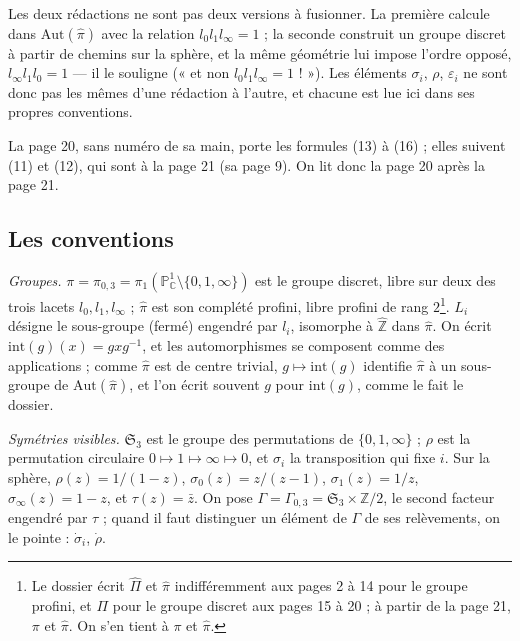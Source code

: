 \documentclass[11pt,a4paper]{article}
\begin{document}
Les deux rédactions ne sont pas deux versions à fusionner. La première
calcule dans $\mathrm{Aut}(\widehat{\pi})$ avec la relation
$l_0 l_1 l_\infty = 1$ ; la seconde construit un groupe discret à partir de
chemins sur la sphère, et la même géométrie lui impose l'ordre opposé,
$l_\infty l_1 l_0 = 1$ — il le souligne (« et non $l_0 l_1 l_\infty = 1$ ! »).
Les éléments $\sigma_i$, $\rho$, $\varepsilon_i$ ne sont donc pas les mêmes
d'une rédaction à l'autre, et chacune est lue ici dans ses propres
conventions.

La page 20, sans numéro de sa main, porte les formules (13) à (16) ; elles
suivent (11) et (12), qui sont à la page 21 (sa page 9). On lit donc la page 20
après la page 21.

\subsection*{Les conventions}

\emph{Groupes.} $\pi = \pi_{0,3} = \pi_1(\mathbb{P}^1_{\mathbb{C}} \setminus
\{0,1,\infty\})$ est le groupe discret, libre sur deux des trois lacets
$l_0, l_1, l_\infty$ ; $\widehat{\pi}$ est son complété profini, libre profini
de rang $2$\footnote{Le dossier écrit $\hat\Pi$ et $\hat\pi$ indifféremment aux
pages 2 à 14 pour le groupe profini, et $\Pi$ pour le groupe discret aux pages
15 à 20 ; à partir de la page 21, $\pi$ et $\hat\pi$. On s'en tient à $\pi$ et
$\widehat{\pi}$.}. $L_i$ désigne le sous-groupe (fermé) engendré par $l_i$,
isomorphe à $\widehat{\mathbb{Z}}$ dans $\widehat{\pi}$. On écrit
$\mathrm{int}(g)(x) = g x g^{-1}$, et les automorphismes se composent comme des
applications ; comme $\widehat{\pi}$ est de centre trivial, $g \mapsto
\mathrm{int}(g)$ identifie $\widehat{\pi}$ à un sous-groupe de
$\mathrm{Aut}(\widehat{\pi})$, et l'on écrit souvent $g$ pour $\mathrm{int}(g)$,
comme le fait le dossier.

\emph{Symétries visibles.} $\mathfrak{S}_3$ est le groupe des permutations de
$\{0, 1, \infty\}$ ; $\rho$ est la permutation circulaire $0 \mapsto 1 \mapsto
\infty \mapsto 0$, et $\sigma_i$ la transposition qui fixe $i$. Sur la sphère,
$\rho(z) = 1/(1-z)$, $\sigma_0(z) = z/(z-1)$, $\sigma_1(z) = 1/z$,
$\sigma_\infty(z) = 1-z$, et $\tau(z) = \bar z$. On pose $\Gamma =
\Gamma_{0,3} = \mathfrak{S}_3 \times \mathbb{Z}/2$, le second facteur engendré
par $\tau$ ; quand il faut distinguer un élément de $\Gamma$ de ses relèvements,
on le pointe : $\dot\sigma_i$, $\dot\rho$.
\end{document}
